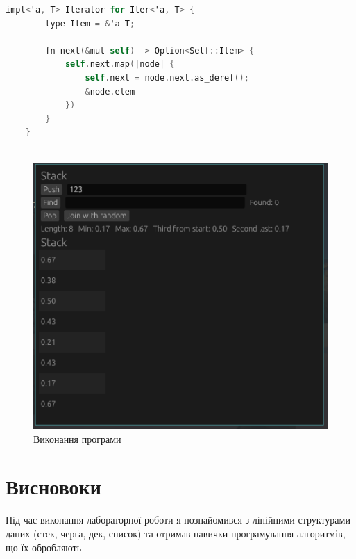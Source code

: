 \documentclass{article}
\begin{document}
\begin{normalsize}
\begin{lstlisting}[language=C]
	impl<'a, T> Iterator for Iter<'a, T> {
		type Item = &'a T;
		
		fn next(&mut self) -> Option<Self::Item> {
			self.next.map(|node| {
				self.next = node.next.as_deref();
				&node.elem
			})
		}
	}
			
		\end{lstlisting}
		
		\begin{figure}[H]
			\centering
			\includegraphics[scale=0.8]{1}	
			\caption{Виконання програми}
		\end{figure}
		
		\section*{Висновоки}
		Під час виконання лабораторної роботи я познайомився з лінійними структурами даних (стек, черга, дек, список) та отримав навички програмування алгоритмів, що їх обробляють
		
	\end{normalsize}
\end{document}
